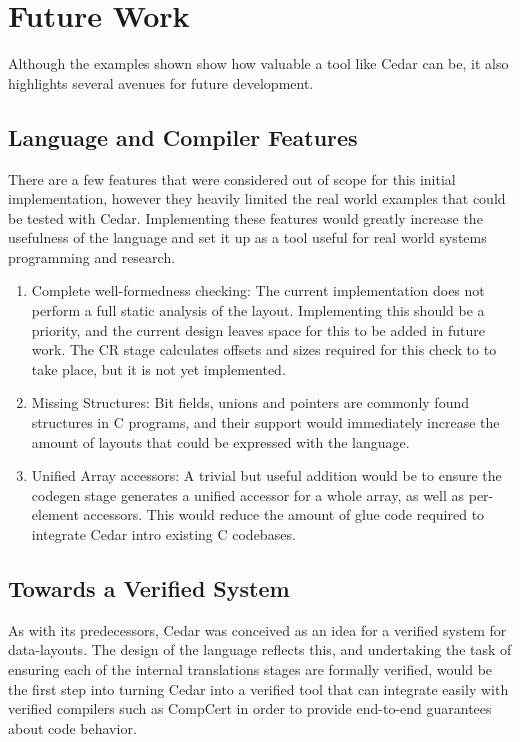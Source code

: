 \section{Future Work}
Although the examples shown show how valuable a tool like
Cedar can be, it also highlights several avenues for future development.

\subsection{Language and Compiler Features}
There are a few features that were considered
out of scope for this initial implementation, however
they heavily limited the real world examples that could be tested
with Cedar. Implementing these features would greatly increase
the usefulness of the language and set it up as a tool useful
for real world systems programming and research.

\begin{enumerate}
    \item Complete well-formedness checking: The current implementation
    does not perform a full static analysis of the layout.
    Implementing this should be a priority, and the current design
    leaves space for this to be added in future work. The CR stage
    calculates offsets and sizes required for this check to to take
    place, but it is not yet implemented.
    \item Missing Structures: Bit fields, unions and pointers
    are commonly found structures in C programs, and their support
    would immediately increase the amount of layouts that could be expressed
    with the language.
    \item Unified Array accessors: A trivial but useful addition
    would be to ensure the codegen stage generates a unified
    accessor for a whole array, as well as per-element accessors. 
    This would reduce the amount of glue code required to
    integrate Cedar intro existing C codebases.
\end{enumerate}

\subsection{Towards a Verified System}
As with its predecessors, Cedar was conceived as an idea
for a verified system for data-layouts.
The design of the language reflects this, and undertaking
the task of ensuring each of the internal translations
stages are formally verified, would be the first step into
turning Cedar into a verified tool that can integrate easily
with verified compilers such as CompCert in order to provide
end-to-end guarantees about code behavior.

